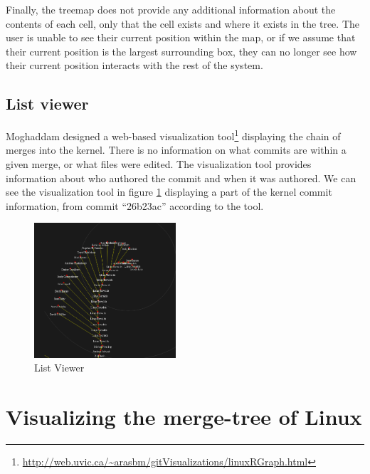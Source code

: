 \documentclass[conference, draftclsnofoot, draft]{IEEEtran}
\begin{document}
Finally, the treemap does not provide any additional information about the
contents of each cell, only that the cell exists and where it exists in the
tree. The user is unable to see their current position within the map, or if we
assume that their current position is the largest surrounding box, they can
no longer see how their current position interacts with the rest of the
system.



\subsection{List viewer}

Moghaddam designed a web-based visualization
tool\footnote{\url{http://web.uvic.ca/~arasbm/gitVisualizations/linuxRGraph.html}}
displaying the chain of merges into the kernel. There is no information on what
commits are within a given merge, or what files were edited. The visualization
tool provides information about who authored the commit and when it was
authored. We can see the visualization tool in figure \ref{fig:listviewer}
displaying a part of the kernel commit information, from commit ``26b23ac''
according to the tool.


\begin{figure}
        \centering
        \includegraphics[width=0.47\textwidth]{figures/gitvis.png}
        \caption{List Viewer}
        \label{fig:listviewer}
\end{figure}

\section{Visualizing the merge-tree of Linux}
\end{document}
